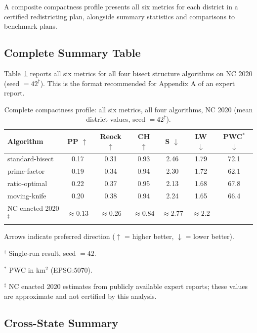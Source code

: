 A composite compactness profile presents all six metrics for each district
in a certified redistricting plan, alongside summary statistics and comparisons
to benchmark plans.

\subsection{Complete Summary Table}

Table~\ref{tab:summary} reports all six metrics for all four bisect structure
algorithms on NC 2020 (seed $= 42^\dagger$).
This is the format recommended for Appendix A of an expert report.

\begin{table}[ht]
\centering
\caption{Complete compactness profile: all six metrics, all four algorithms,
NC 2020 (mean district values, seed $= 42^\dagger$).}
\label{tab:summary}
\begin{tabular}{lcccccc}
\toprule
Algorithm & PP $\uparrow$ & Reock $\uparrow$ & CH $\uparrow$ & S $\downarrow$ & LW $\downarrow$ & PWC$^*$ $\downarrow$ \\
\midrule
standard-bisect & 0.17 & 0.31 & 0.93 & 2.46 & 1.79 & 72.1 \\
prime-factor    & 0.19 & 0.34 & 0.94 & 2.30 & 1.72 & 62.1 \\
ratio-optimal   & 0.22 & 0.37 & 0.95 & 2.13 & 1.68 & 67.8 \\
moving-knife    & 0.20 & 0.38 & 0.94 & 2.24 & 1.65 & 66.4 \\
\midrule
NC enacted 2020$^\ddagger$ & $\approx 0.13$ & $\approx 0.26$ & $\approx 0.84$ & $\approx 2.77$ & $\approx 2.2$ & --- \\
\bottomrule
\end{tabular}
\begin{tablenotes}
\footnotesize
\item Arrows indicate preferred direction ($\uparrow$ = higher better, $\downarrow$ = lower better).
\item $^\dagger$ Single-run result, seed $= 42$.
\item $^*$ PWC in km$^2$ (EPSG:5070).
\item $^\ddagger$ NC enacted 2020 estimates from publicly available expert reports;
  these values are approximate and not certified by this analysis.
\end{tablenotes}
\end{table}

\subsection{Cross-State Summary}

